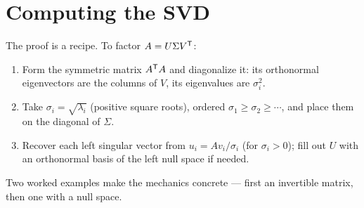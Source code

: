 
\section{Computing the SVD}

The proof is a recipe. To factor $A=U\Sigma V^{\mathsf T}$:
\begin{enumerate}
   \item Form the symmetric matrix $A^{\mathsf T} A$ and diagonalize it: its orthonormal eigenvectors are the columns of $V$, its eigenvalues are $\sigma_i^2$.
   \item Take $\sigma_i=\sqrt{\lambda_i}$ (positive square roots), ordered $\sigma_1\ge\sigma_2\ge\cdots$, and place them on the diagonal of $\Sigma$.
   \item Recover each left singular vector from $u_i=Av_i/\sigma_i$ (for $\sigma_i>0$); fill out $U$ with an orthonormal basis of the left null space if needed.
\end{enumerate}
Two worked examples make the mechanics concrete --- first an invertible matrix, then one with a null space.

